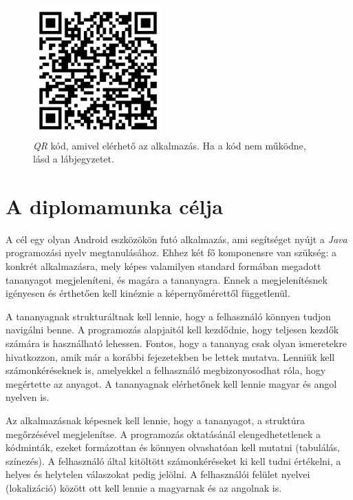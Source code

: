 \documentclass[12pt,a4paper]{article}
\begin{document}
	 \begin{figure}[h!]
	 	\centering
	 	\includegraphics[width=5cm]{learn_java_qr_code}
	 	\caption[Alkalmazás QR Caption]{\textit{QR} kód, amivel elérhető az alkalmazás. Ha a kód nem működne, lásd a lábjegyzetet\footnotemark.}
	 	\label{qr}
	 \end{figure}

	\section{A diplomamunka célja}\label{celok}
	
	A cél egy olyan Android eszközökön futó alkalmazás, ami segítséget nyújt a \textit{Java} programozási nyelv megtanulásához. Ehhez két fő komponensre van szükség: a konkrét alkalmazásra, mely képes valamilyen standard formában megadott tananyagot megjeleníteni, és magára a tananyagra. Ennek a megjelenítésnek igényesen és érthetően kell kinéznie a képernyőmérettől függetlenül.

	A tananyagnak strukturáltnak kell lennie, hogy a felhasználó könnyen tudjon navigálni benne. A programozás alapjaitól kell kezdődnie, hogy teljesen kezdők számára is használható lehessen. Fontos, hogy a tananyag csak olyan ismeretekre hivatkozzon, amik már a korábbi fejezetekben be lettek mutatva. Lenniük kell számonkéréseknek is, amelyekkel a felhasználó megbizonyosodhat róla, hogy megértette az anyagot. A tananyagnak elérhetőnek kell lennie magyar és angol nyelven is.
	
	Az alkalmazásnak képesnek kell lennie, hogy a tananyagot, a struktúra megőrzésével megjelenítse. A programozás oktatásánál elengedhetetlenek a kódminták, ezeket formázottan és könnyen olvashatóan kell mutatni (tabulálás, színezés). A felhasználó által kitöltött számonkéréseket ki kell tudni értékelni, a helyes és helytelen válaszokat pedig jelölni. A felhasználói felület nyelvei (lokalizáció) között ott kell lennie a magyarnak és az angolnak is.
	
\end{document}
